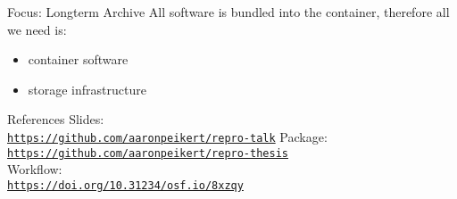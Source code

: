 \documentclass[12pt,t]{beamer}
\begin{document}
\begin{frame}[c]{Focus: Longterm Archive}
	\textcolor<2>{lolit}{All software is bundled into the container, therefore all we need is:}
	\begin{itemize}
		\item \textcolor<2>{lolit}{container software}
		\item \textcolor<2>{lolit}{storage infrastructure}
	\end{itemize}


\end{frame}


\begin{frame}[c]{References}
	\textcolor{lolit}{Slides:\\}\href{https://github.com/aaronpeikert/repro-talk}{\texttt{\textcolor{foreground}{https://github.com/aaronpeikert/repro-talk}}}
	\textcolor{lolit}{Package:\\}\href{https://github.com/aaronpeikert/repro-thesis}{\texttt{\textcolor{foreground}{https://github.com/aaronpeikert/repro-thesis}}}\\
	\textcolor{lolit}{Workflow:\\}\href{https://doi.org/10.31234/osf.io/8xzqy}{\texttt{\textcolor{foreground}{https://doi.org/10.31234/osf.io/8xzqy}}}
\end{frame}
\end{document}
